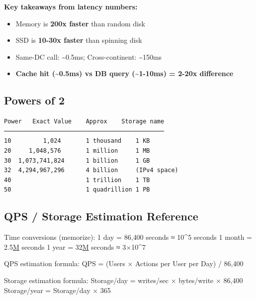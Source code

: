 \documentclass[11pt]{article}
\providecommand{\tightlist}{\setlength{\itemsep}{1pt}\setlength{\parskip}{0pt}}
\newenvironment{Shaded}{\begin{snugshade}}{\end{snugshade}}
\newcommand{\BuiltInTok}[1]{\textcolor[rgb]{0.50,0.55,0.55}{#1}}
\newcommand{\DecValTok}[1]{\textcolor[rgb]{0.96,0.45,0.00}{#1}}
\newcommand{\ErrorTok}[1]{\textcolor[rgb]{0.85,0.27,0.33}{\underline{#1}}}
\newcommand{\FloatTok}[1]{\textcolor[rgb]{0.96,0.45,0.00}{#1}}
\newcommand{\NormalTok}[1]{\textcolor[rgb]{0.81,0.81,0.76}{#1}}
\newcommand{\OperatorTok}[1]{\textcolor[rgb]{0.81,0.81,0.76}{#1}}
\begin{document}
\textbf{Key takeaways from latency numbers:}

\begin{itemize}
\tightlist
\item
  Memory is \textbf{200x faster} than random disk
\item
  SSD is \textbf{10-30x faster} than spinning disk
\item
  Same-DC call: \textasciitilde0.5ms; Cross-continent: \textasciitilde150ms
\item
  \textbf{Cache hit (\textasciitilde0.5ms) vs DB query (\textasciitilde1-10ms) = 2-20x difference}
\end{itemize}

\subsection{Powers of 2}\label{powers-of-2}

\setcodelang{}

\begin{verbatim}
Power   Exact Value    Approx    Storage name
─────────────────────────────────────────────
10         1,024       1 thousand    1 KB
20     1,048,576       1 million     1 MB
30  1,073,741,824      1 billion     1 GB
32  4,294,967,296      4 billion     (IPv4 space)
40                     1 trillion    1 TB
50                     1 quadrillion 1 PB
\end{verbatim}

\subsection{QPS / Storage Estimation Reference}\label{qps--storage-estimation-reference}


\begin{Shaded}
\begin{Highlighting}[]
\NormalTok{Time conversions (memorize):}
  \DecValTok{1}\NormalTok{ day    }\OperatorTok{=} \DecValTok{86}\NormalTok{,}\DecValTok{400}\NormalTok{ seconds ≈ }\DecValTok{10}\OperatorTok{\^{}}\DecValTok{5}\NormalTok{ seconds}
  \DecValTok{1}\NormalTok{ month  }\OperatorTok{=} \FloatTok{2.5}\ErrorTok{M}\NormalTok{ seconds}
  \DecValTok{1}\NormalTok{ year   }\OperatorTok{=} \DecValTok{32}\ErrorTok{M}\NormalTok{ seconds ≈ }\DecValTok{3}\NormalTok{×}\DecValTok{10}\OperatorTok{\^{}}\DecValTok{7}

\NormalTok{QPS estimation formula:}
\NormalTok{  QPS }\OperatorTok{=}\NormalTok{ (Users × Actions per User per Day) }\OperatorTok{/} \DecValTok{86}\NormalTok{,}\DecValTok{400}

\NormalTok{Storage estimation formula:}
\NormalTok{  Storage}\OperatorTok{/}\NormalTok{day }\OperatorTok{=}\NormalTok{ writes}\OperatorTok{/}\NormalTok{sec × }\BuiltInTok{bytes}\OperatorTok{/}\NormalTok{write × }\DecValTok{86}\NormalTok{,}\DecValTok{400}
\NormalTok{  Storage}\OperatorTok{/}\NormalTok{year }\OperatorTok{=}\NormalTok{ Storage}\OperatorTok{/}\NormalTok{day × }\DecValTok{365}
\end{Highlighting}
\end{Shaded}
\end{document}
